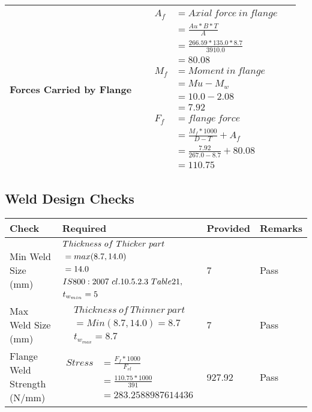 \documentclass{article}%
\begin{document}
\begin{longtable}{|p{4cm}|p{5cm}|p{5.5cm}|p{1.5cm}|}
\hline%
Forces Carried by Flange&&$\begin{aligned} A_f&= Axial~force~ in ~flange  \\ &= \frac{Au * B *T}{A} \\ &= \frac{266.59 * 135.0*8.7}{3910.0} \\ &=80.08\\ M_f& =Moment~ in~ flange \\  & = Mu-M_w\\ &= 10.0-2.08\\ &=7.92\\  F_f& =flange~force  \\ & = \frac{M_f *1000}{D-T} + A_f \\ &= \frac{7.92}{267.0-8.7} +80.08 \\ &=110.75\end{aligned}$&\\%
\hline%
\end{longtable}

%
\newpage%
\subsection{Weld Design Checks}%
\label{subsec:WeldDesignChecks}%
\renewcommand{\arraystretch}{1.2}%
\begin{longtable}{|p{4cm}|p{5cm}|p{5.5cm}|p{1.5cm}|}%
\hline%
\rowcolor{OsdagGreen}%
Check&Required&Provided&Remarks\\%
\hline%
\endhead%
\hline%
Min Weld Size (mm)&$\begin{aligned} &Thickness~of~Thicker~part\\ \noindent &=max(8.7,14.0)\\ &=14.0\\ &IS800:2007~cl.10.5.2.3~Table 21,\\  &t_{w_{min}}=5\end{aligned}$&7&Pass\\%
\hline%
Max Weld Size (mm)&$\begin{aligned} & Thickness~of~Thinner~part\\ &=Min(8.7,14.0)=8.7\\ &t_{w_{max}} =8.7\end{aligned}$&7&Pass\\%
\hline%
Flange Weld Strength (N/mm)&$\begin{aligned} Stress &= \frac{F_f*1000}{F_{rl}}\\  &= \frac{110.75*1000}{391}\\ &= 283.2588987614436\end{aligned}$&927.92&Pass\\%
\hline%
\end{longtable}
\end{document}
